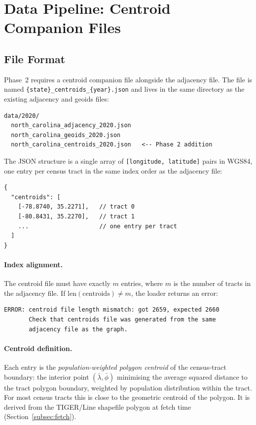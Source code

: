 \section{Data Pipeline: Centroid Companion Files}
\label{sec:data-pipeline}

\subsection{File Format}

Phase~2 \cvdgeo{} requires a centroid companion file alongside the adjacency
file.
The file is named \texttt{\{state\}\_centroids\_\{year\}.json} and lives in
the same directory as the existing adjacency and geoids files:

\begin{verbatim}
data/2020/
  north_carolina_adjacency_2020.json
  north_carolina_geoids_2020.json
  north_carolina_centroids_2020.json   <-- Phase 2 addition
\end{verbatim}

The JSON structure is a single array of \texttt{[longitude, latitude]} pairs
in WGS84, one entry per census tract in the same index order as the
adjacency file:

\begin{verbatim}
{
  "centroids": [
    [-78.8740, 35.2271],   // tract 0
    [-80.8431, 35.2270],   // tract 1
    ...                    // one entry per tract
  ]
}
\end{verbatim}

\paragraph{Index alignment.}
The centroid file must have exactly $m$ entries, where $m$ is the number of
tracts in the adjacency file.
If $\mathrm{len}(\mathrm{centroids}) \ne m$, the loader returns an error:

\begin{verbatim}
ERROR: centroid file length mismatch: got 2659, expected 2660
       Check that centroids file was generated from the same
       adjacency file as the graph.
\end{verbatim}

\paragraph{Centroid definition.}
Each entry is the \emph{population-weighted polygon centroid} of the
census-tract boundary: the interior point $(\bar{\lambda}, \bar{\phi})$
minimising the average squared distance to the tract polygon boundary,
weighted by population distribution within the tract.
For most census tracts this is close to the geometric centroid of the polygon.
It is derived from the TIGER/Line shapefile polygon at fetch time
(Section~\ref{subsec:fetch}).

